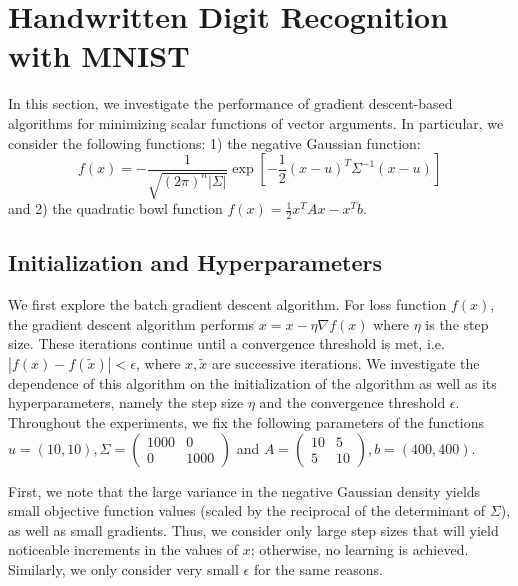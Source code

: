 \documentclass[10pt,psamsfonts]{amsart}
\theoremstyle{definition}
\theoremstyle{remark}
\numberwithin{equation}{section}
\begin{document}
\section{Handwritten Digit Recognition with MNIST}













In this section, we investigate the performance of gradient descent-based algorithms for minimizing scalar functions of vector arguments. In particular, we consider the following functions: 1) the negative Gaussian function:
$$f(x) = -\frac{1}{\sqrt{(2\pi)^n |\Sigma|}} \exp\left[ -\frac{1}{2}(x-u)^T\Sigma^{-1}(x-u) \right]$$
and 2) the quadratic bowl function $f(x) = \frac{1}{2}x^TAx - x^Tb$.
\subsection{Initialization and Hyperparameters} We first explore the batch gradient descent algorithm. For loss function $f(x)$, the gradient descent algorithm performs $x = x - \eta \nabla f(x)$
where $\eta$ is the step size. These iterations continue until a convergence threshold is met, i.e. $|f(x) - f(\tilde{x})| < \epsilon$, where $x, \tilde{x}$ are successive iterations. We investigate the dependence of this algorithm on the initialization of the algorithm as well as its hyperparameters, namely the step size $\eta$ and the convergence threshold $\epsilon$. Throughout the experiments, we fix the following parameters of the functions $u = (10, 10),\Sigma = \begin{pmatrix} 1000 & 0 \\ 0 & 1000\end{pmatrix}$ and $A = \begin{pmatrix} 10 & 5 \\ 5 & 10\end{pmatrix},b = (400, 400)$.

First, we note that the large variance in the negative Gaussian density yields small objective function values (scaled by the reciprocal of the determinant of $\Sigma$), as well as small gradients. Thus, we consider only large step sizes that will yield noticeable increments in the values of $x$; otherwise, no learning is achieved. Similarly, we only consider very small $\epsilon$ for the same reasons.
\end{document}
